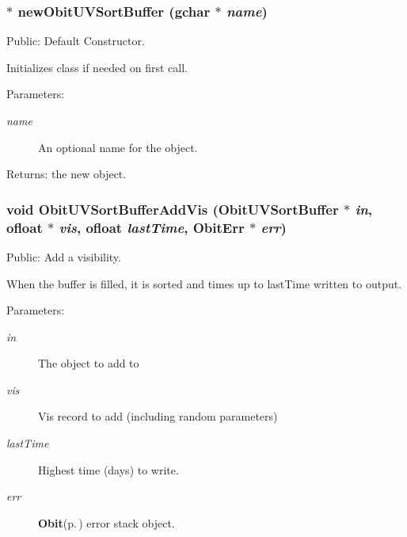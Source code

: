 \subsubsection{$\ast$ new\-Obit\-UVSort\-Buffer (gchar $\ast$ {\em name})}\label{ObitUVSortBuffer_8h_a8}


Public: Default Constructor. 

Initializes class if needed on first call. \begin{Desc}
\item[Parameters:]
\begin{description}
\item[{\em name}]An optional name for the object. \end{description}
\end{Desc}
\begin{Desc}
\item[Returns:]the new object. \end{Desc}
\subsubsection{\setlength{\rightskip}{0pt plus 5cm}void Obit\-UVSort\-Buffer\-Add\-Vis ({\bf Obit\-UVSort\-Buffer} $\ast$ {\em in}, {\bf ofloat} $\ast$ {\em vis}, {\bf ofloat} {\em last\-Time}, {\bf Obit\-Err} $\ast$ {\em err})}\label{ObitUVSortBuffer_8h_a13}


Public: Add a visibility. 

When the buffer is filled, it is sorted and times up to last\-Time written to output. \begin{Desc}
\item[Parameters:]
\begin{description}
\item[{\em in}]The object to add to \item[{\em vis}]Vis record to add (including random parameters) \item[{\em last\-Time}]Highest time (days) to write. \item[{\em err}]{\bf Obit}{\rm (p.\,\pageref{structObit})} error stack object. \end{description}
\end{Desc}

